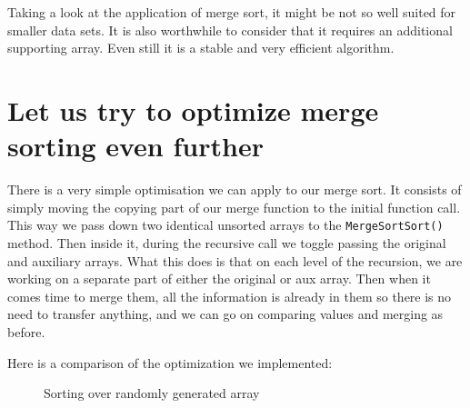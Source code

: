 \documentclass[a4paper,11pt]{article}
\begin{document}
Taking a look at the application of merge sort, it might be not so well suited for smaller data sets. It is also worthwhile to consider that it requires an additional supporting array. Even still it is a stable and very efficient algorithm.

\section*{Let us try to optimize merge sorting even further}

There is a very simple optimisation we can apply to our merge sort. It consists of simply moving the copying part of our merge function to the initial function call. This way we pass down two identical unsorted arrays to the {\tt MergeSortSort()} method. Then inside it, during the recursive call we toggle passing the original and auxiliary arrays. What this does is that on each level of the recursion, we are working on a separate part of either the original or aux array. Then when it comes time to merge them, all the information is already in them so there is no need to transfer anything, and we can go on comparing values and merging as before.

Here is a comparison of the optimization we implemented:

\begin{figure}[H]
    \centering
    \caption{Sorting over randomly generated array}
    \label{fig:plot1}
\end{figure}
\end{document}
